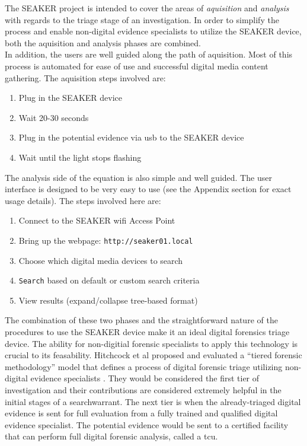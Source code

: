 \documentclass[12pt]{article}
\begin{document}
The SEAKER project is intended to cover the areas of {\em aquisition} and {\em analysis}
with regards to the triage stage of an investigation.  In order to simplify the process and
enable non-digital evidence specialists to utilize the SEAKER device, both the
aquisition and analysis phases are combined.\\

In addition, the users are well guided along the path of aquisition.  Most of this process is
automated for ease of use and successful digital media content gathering.  The aquisition 
steps involved are:

\vspace{0.5 cm}
\begin{enumerate}
  \item Plug in the SEAKER device
  \item Wait 20-30 seconds
  \item Plug in the potential evidence via \gls{usb} to the SEAKER device
  \item Wait until the light stops flashing
\end{enumerate}
\vspace{0.5 cm}

The analysis side of the equation is also simple and well guided.  The user interface is 
designed to be very easy to use (see the Appendix section for exact usage details).  The steps
involved here are:

\vspace{0.5 cm}
\begin{enumerate}
  \item Connect to the SEAKER \gls{wifi} Access Point
  \item Bring up the webpage: {\tt http://seaker01.local}
  \item Choose which digital media devices to search
  \item \verb|Search| based on default or custom search criteria
  \item View results (expand/collapse tree-based format)
\end{enumerate}
\vspace{0.5 cm}

The combination of these two phases and the straightforward nature of the procedures to use
the SEAKER device make it an ideal digital forensics triage device.  The ability for
non-digitial forensic specialists to apply this technology is crucial to its feasability.
Hitchcock et al proposed and evaluated a ``tiered forensic
methodology'' model that defines a process of digital forensic triage utilizing non-digital
evidence specialists \cite{hitchcock2016tiered}.  They would be considered the first tier of
investigation and their
contributions are considered extremely helpful in the initial stages of a \gls{searchwarrant}.
The next tier is when the already-triaged digital evidence is sent for full evaluation from
a fully trained and qualified digital evidence specialist.
The potential evidence would be sent to a certified facility that can perform full digital
forensic analysis, called a \gls{tcu}.\\
\end{document}

